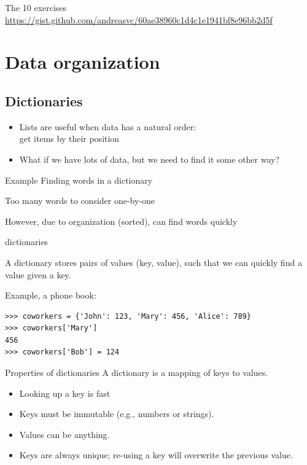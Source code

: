 \documentclass[aspectratio=169,usenames,dvipsnames]{beamer}
\begin{document}
\begin{frame}{The 10 exercises}
    \centering\Large
    \url{https://gist.github.com/andreasvc/60ae38960c1d4c1e1941bf8e96bb2d5f}
\end{frame}



\section{Data organization}
\subsection{Dictionaries}
\frame{\tableofcontents[currentsection]}

\begin{frame}
    \begin{itemize}
        \item Lists are useful when data has a natural order: \\
            get items by their position
        \pause
        \item What if we have lots of data,
            but we need to find it some other way?
    \end{itemize}

    \begin{block}{Example}
    Finding words in a dictionary

    Too many words to consider one-by-one

    However, due to organization (sorted), can find words quickly
    \end{block}
\end{frame}


\begin{frame}[fragile]{dictionaries}
    \begin{definition}
        A dictionary stores pairs of values (key, value),
        such that we can quickly find a value given a key.
    \end{definition}
Example, a phone book:
\begin{lstlisting}
>>> coworkers = {'John': 123, 'Mary': 456, 'Alice': 789}
>>> coworkers['Mary']
456
>>> coworkers['Bob'] = 124
\end{lstlisting}

\end{frame}

\begin{frame}{Properties of dictionaries}
A dictionary is a mapping of keys to values.

    \begin{itemize}
        \item Looking up a key is fast
        \item Keys must be immutable (e.g., numbers or strings).
        \item Values can be anything.
        \item Keys are always unique;
            re-using a key will overwrite the previous value.
    \end{itemize}
\end{frame}
\end{document}

